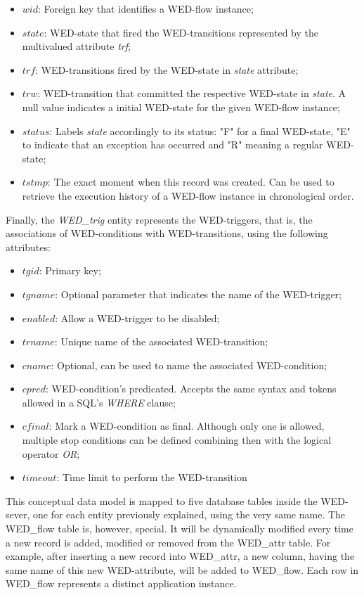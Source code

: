 \documentclass[conference]{IEEEtran}
\begin{document}
\begin{itemize}  
\item $wid$: Foreign key that identifies a WED-flow instance;
\item $state$: WED-state that fired the WED-transitions represented by the multivalued attribute \emph{trf};  
\item $trf$: WED-transitions fired by the WED-state in \emph{state} attribute;
\item $trw$: WED-transition that committed the respective WED-state in \emph{state}. A null value indicates a initial WED-state for
             the given WED-flow instance;
\item $status$: Labels \emph{state} accordingly to its status: "F" for a final WED-state, "E" to indicate that an exception has occurred
               and "R" meaning a regular WED-state;
\item $tstmp$: The exact moment when this record was created. Can be used to retrieve the execution history of a WED-flow instance
              in chronological order. 
\end{itemize}

Finally, the \emph{WED\_trig} entity represents the WED-triggers, that is, the associations of WED-conditions with WED-transitions,
using the following attributes:

\begin{itemize}
\item $tgid$: Primary key; 
\item $tgname$: Optional parameter that indicates the name of the WED-trigger; 
\item $enabled$: Allow a WED-trigger to be disabled;
\item $trname$: Unique name of the associated WED-transition;
\item $cname$: Optional, can be used to name the associated WED-condition; 
\item $cpred$: WED-condition's predicated. Accepts the same syntax and tokens allowed in a SQL's \emph{WHERE} clause;
\item $cfinal$: Mark a WED-condition as final. Although only one is allowed, multiple stop conditions can be defined 
               combining then with the logical operator \emph{OR}; 
\item $timeout$: Time limit to perform the WED-transition 
\end{itemize}

This conceptual data model is mapped to five database tables inside the WED-sever, one for each entity previously explained,
using the very same name. The WED\_flow table is, however, special. It will be dynamically modified every time a new record
is added, modified or removed from the WED\_attr table. For example, after inserting a new record into WED\_attr, a new column,
having the same name of this new WED-attribute, will be added to WED\_flow. Each row in WED\_flow represents a distinct application
instance.  
\end{document}
